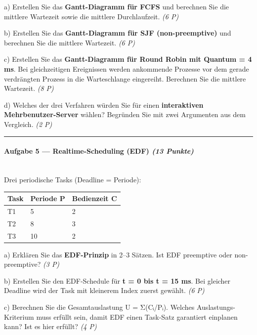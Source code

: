 \documentclass[11pt, a4paper]{article}
\begin{document}
a) Erstellen Sie das \textbf{Gantt-Diagramm für FCFS} und berechnen Sie die mittlere Wartezeit sowie die mittlere Durchlaufzeit. \textit{(6 P)}


b) Erstellen Sie das \textbf{Gantt-Diagramm für SJF (non-preemptive)} und berechnen Sie die mittlere Wartezeit. \textit{(6 P)}


c) Erstellen Sie das \textbf{Gantt-Diagramm für Round Robin mit Quantum = 4 ms}. Bei gleichzeitigen Ereignissen werden ankommende Prozesse vor dem gerade verdrängten Prozess in die Warteschlange eingereiht. Berechnen Sie die mittlere Wartezeit. \textit{(8 P)}


d) Welches der drei Verfahren würden Sie für einen \textbf{interaktiven Mehrbenutzer-Server} wählen? Begründen Sie mit zwei Argumenten aus dem Vergleich. \textit{(2 P)}



\noindent\textcolor{rulegray}{\rule{\linewidth}{0.4pt}}


\paragraph{Aufgabe 5 — Realtime-Scheduling (EDF) \textit{(13 Punkte)}}\mbox{}\\[2pt]

Drei periodische Tasks (Deadline = Periode):



{\small
\begin{tabularx}{\linewidth}{XXX}
\hline
\rowcolor{tableheadbg}
{\color{white}\textbf{Task}} & {\color{white}\textbf{Periode P}} & {\color{white}\textbf{Bedienzeit C}} \\[2pt]
\hline
\endhead
\hline
\endfoot
T1 & 5 & 2 \\
T2 & 8 & 3 \\
T3 & 10 & 2 \\
\end{tabularx}
}


a) Erklären Sie das \textbf{EDF-Prinzip} in 2–3 Sätzen. Ist EDF preemptive oder non-preemptive? \textit{(3 P)}


b) Erstellen Sie den EDF-Schedule für \textbf{t = 0 bis t = 15 ms}. Bei gleicher Deadline wird der Task mit kleinerem Index zuerst gewählt. \textit{(6 P)}


c) Berechnen Sie die Gesamtauslastung U = Σ(Cᵢ/Pᵢ). Welches Auslastungs-Kriterium muss erfüllt sein, damit EDF einen Task-Satz garantiert einplanen kann? Ist es hier erfüllt? \textit{(4 P)}
\end{document}
